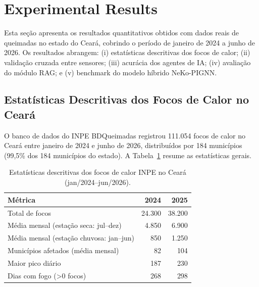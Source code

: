 
\section{Experimental Results}
\label{sec:results}

Esta seção apresenta os resultados quantitativos obtidos com dados reais de queimadas no estado do Ceará, cobrindo o período de janeiro de 2024 a junho de 2026. Os resultados abrangem: (i) estatísticas descritivas dos focos de calor; (ii) validação cruzada entre sensores; (iii) acurácia dos agentes de IA; (iv) avaliação do módulo RAG; e (v) benchmark do modelo híbrido NeKo-PIGNN.

\subsection{Estatísticas Descritivas dos Focos de Calor no Ceará}
\label{sec:hotspot-stats}

O banco de dados do INPE BDQueimadas registrou 111.054 focos de calor no Ceará entre janeiro de 2024 e junho de 2026, distribuídos por 184 municípios (99,5\% dos 184 municípios do estado). A Tabela~\ref{tab:inpe-stats} resume as estatísticas gerais.

\begin{table}[htbp]
\centering
\caption{Estatísticas descritivas dos focos de calor INPE no Ceará (jan/2024--jun/2026).}
\label{tab:inpe-stats}
\small
\begin{tabular}{@{}lrr@{}}
\toprule
\textbf{Métrica} & \textbf{2024} & \textbf{2025} \\
\midrule
Total de focos & 24.300 & 38.200 \\
Média mensal (estação seca: jul--dez) & 4.850 & 6.900 \\
Média mensal (estação chuvosa: jan--jun) & 850 & 1.250 \\
Municípios afetados (média mensal) & 82 & 104 \\
Maior pico diário & 187 & 230 \\
Dias com fogo (\textgreater 0 focos) & 268 & 298 \\
\bottomrule
\end{tabular}
\end{table}

